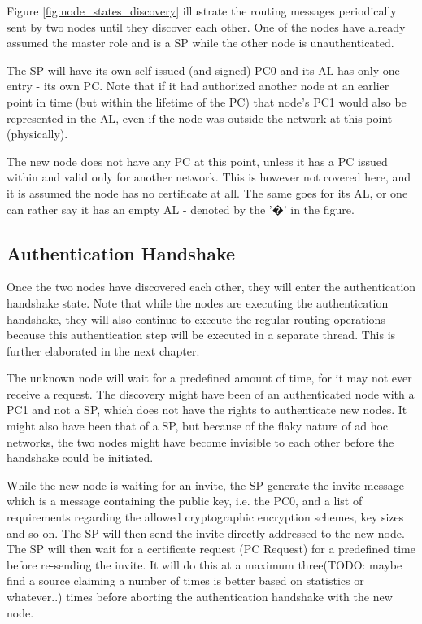 Figure \ref{fig:node_states_discovery} illustrate the routing messages
periodically sent by two nodes until they discover each other. One of the nodes
have already assumed the master role and is a \ac{SP} while the other node is
unauthenticated.

The \ac{SP} will have its own self-issued (and signed) \ac{PC0} and its \ac{AL}
has only one entry - its own \ac{PC}. Note that if it had authorized another
node at an earlier point in time (but within the lifetime of the \ac{PC}) that
node's \ac{PC1} would also be represented in the \ac{AL}, even if the node was
outside the network at this point (physically).

The new node does not have any \ac{PC} at this point, unless it has a \ac{PC}
issued within and valid only for another network. This is however not covered
here, and it is assumed the node has no certificate at all. The same goes for
its \ac{AL}, or one can rather say it has an empty \ac{AL} - denoted by the '�'
in the figure.

\subsection{Authentication Handshake}
Once the two nodes have discovered each other, they will enter the
authentication handshake state. Note that while the nodes are executing the
authentication handshake, they will also continue to execute the regular routing
operations because this authentication step will be executed in a separate
thread. This is further elaborated in the next chapter.

The unknown node will wait for a predefined amount of time, for it may not ever
receive a request. The discovery might have been of an authenticated node with a
\ac{PC1} and not a \ac{SP}, which does not have the rights to authenticate new
nodes. It might also have been that of a \ac{SP}, but because of the flaky
nature of ad hoc networks, the two nodes might have become invisible to each
other before the handshake could be initiated.

While the new node is waiting for an invite, the \ac{SP} generate the invite
message which is a message containing the public key, i.e. the \ac{PC0}, and a
list of requirements regarding the allowed cryptographic encryption schemes, key
sizes and so on. The \ac{SP} will then send the invite directly addressed to the
new node. The \ac{SP} will then wait for a certificate request (\ac{PC} Request)
for a predefined time before re-sending the invite. It will do this at a maximum
three(TODO: maybe find a source claiming a number of times is better based on
statistics or whatever..) times before aborting the authentication handshake
with the new node.


